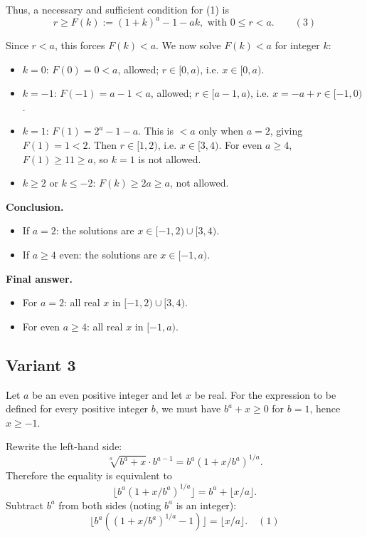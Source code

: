 \documentclass[12pt,a4paper]{article}
\theoremstyle{definition}
\begin{document}
    Thus, a necessary and sufficient condition for (1) is
    $$r \geq F(k) := (1 + k)^a - 1 - a k, \text{ with } 0 \leq r < a. \qquad (3)$$

    Since $r < a$, this forces $F(k) < a$. We now solve $F(k) < a$ for integer $k$:

    \begin{itemize}
        \item $k = 0$: $F(0) = 0 < a$, allowed; $r \in [0, a)$, i.e. $x \in [0, a)$.

        \item $k = -1$: $F(-1) = a - 1 < a$, allowed; $r \in [a - 1, a)$, i.e. $x = -a + r \in [-1, 0)$.

        \item $k = 1$: $F(1) = 2^a - 1 - a$. This is $< a$ only when $a = 2$, giving $F(1) = 1 < 2$. Then $r \in [1, 2)$, i.e. $x \in [3, 4)$. For even $a \geq 4$, $F(1) \geq 11 \geq a$, so $k = 1$ is not allowed.

        \item $k \geq 2$ or $k \leq -2$: $F(k) \geq 2a \geq a$, not allowed.
    \end{itemize}

    \textbf{Conclusion.}
    \begin{itemize}
        \item If $a = 2$: the solutions are $x \in [-1, 2) \cup [3, 4)$.
        \item If $a \geq 4$ even: the solutions are $x \in [-1, a)$.
    \end{itemize}

    \textbf{Final answer.}
    \begin{itemize}
        \item For $a = 2$: all real $x$ in $[-1, 2) \cup [3, 4)$.
        \item For even $a \geq 4$: all real $x$ in $[-1, a)$.
    \end{itemize}

    \subsection{Variant 3}
    Let $a$ be an even positive integer and let $x$ be real. For the expression to be defined for every positive integer $b$, we must have $b^a + x \geq 0$ for $b = 1$, hence $x \geq -1$.

    Rewrite the left-hand side:
    $$\sqrt[a]{b^a + x} \cdot b^{a-1} = b^a (1 + x/b^a)^{1/a}.$$
    Therefore the equality is equivalent to
    $$\lfloor b^a (1 + x/b^a)^{1/a} \rfloor = b^a + \lfloor x/a \rfloor.$$
    Subtract $b^a$ from both sides (noting $b^a$ is an integer):
    $$\lfloor b^a((1 + x/b^a)^{1/a} - 1) \rfloor = \lfloor x/a \rfloor. \quad (1)$$
\end{document}
